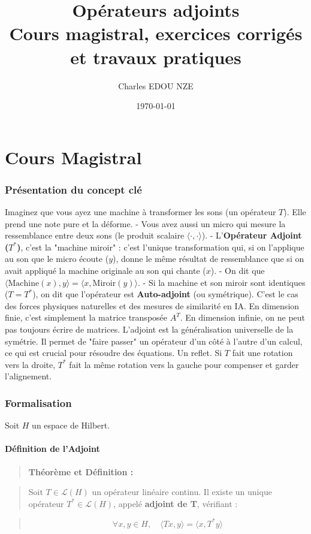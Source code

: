 \documentclass[11pt,a4paper]{article}
\title{\Huge Opérateurs adjoints \\ \large Cours magistral, exercices corrigés et travaux pratiques}
\author{\Large Charles EDOU NZE}
\date{\today}
\begin{document}
\maketitle
\tableofcontents
\newpage

\part{Cours Magistral}


\section{Présentation du concept clé}

 Imaginez que vous ayez une machine à transformer les sons (un opérateur $T$). Elle prend une note pure et la déforme.
    - Vous avez aussi un micro qui mesure la ressemblance entre deux sons (le produit scalaire $\langle \cdot, \cdot \rangle$).
    - L'\textbf{Opérateur Adjoint ($T^*$)}, c'est la "machine miroir" : c'est l'unique transformation qui, si on l'applique au son que le micro écoute ($y$), donne le même résultat de ressemblance que si on avait appliqué la machine originale au son qui chante ($x$).
    - On dit que $\langle \text{Machine}(x), y \rangle = \langle x, \text{Miroir}(y) \rangle$.
    - Si la machine et son miroir sont identiques ($T = T^*$), on dit que l'opérateur est \textbf{Auto-adjoint} (ou symétrique). C'est le cas des forces physiques naturelles et des mesures de similarité en IA.
 En dimension finie, c'est simplement la matrice transposée $A^T$. En dimension infinie, on ne peut pas toujours écrire de matrices. L'adjoint est la généralisation universelle de la symétrie. Il permet de "faire passer" un opérateur d'un côté à l'autre d'un calcul, ce qui est crucial pour résoudre des équations.
 Un reflet. Si $T$ fait une rotation vers la droite, $T^*$ fait la même rotation vers la gauche pour compenser et garder l'alignement.

\section{Formalisation}

Soit $H$ un espace de Hilbert.

\subsection{Définition de l'Adjoint}

\begin{quote}
\textbf{Théorème et Définition :}
\end{quote}
\begin{quote}
Soit $T \in \mathcal{L}(H)$ un opérateur linéaire continu. Il existe un unique opérateur $T^* \in \mathcal{L}(H)$, appelé \textbf{adjoint de T}, vérifiant :
\end{quote}
\begin{quote}
$$\forall x, y \in H, \quad \langle Tx, y \rangle = \langle x, T^*y \rangle$$
\end{quote}
\end{document}
